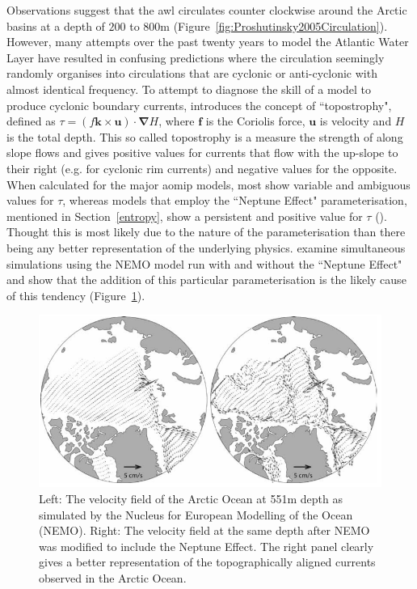 \documentclass[12pt,a4paper]{report}
\newcommand*\figref[1]{Figure~\ref{#1}}
\newcommand*\secref[1]{Section~\ref{#1}}
\begin{document}
Observations suggest that the \gls{awl} circulates counter clockwise around the
 Arctic basins at a depth of $200$ to $800\mathrm{m}$
 (\figref{fig:Proshutinsky2005Circulation}). However, many attempts over the past twenty
 years to model the Atlantic Water Layer have resulted in confusing predictions where the
 circulation seemingly randomly organises into circulations that are cyclonic or
 anti-cyclonic with almost identical frequency. To attempt to diagnose the skill of a model
 to produce cyclonic boundary currents, \cite{holloway2007water} introduces the concept of ``topostrophy",
 defined as   $\tau=(f\boldsymbol{k}\times\boldsymbol{u})\cdot\boldsymbol{\nabla}H$, where
 $\boldsymbol{f}$  is the Coriolis force,  $\boldsymbol{u}$ is velocity and  $H$ is the total depth. 
 This so called topostrophy is a measure the strength of along slope flows and gives
 positive values for currents that flow with the up-slope to their right (e.g. for cyclonic
 rim currents) and negative values for the opposite.  When calculated for the major
 \gls{aomip} models, most show variable and ambiguous values for $\tau$,  whereas models that
 employ the ``Neptune Effect" parameterisation, mentioned in \secref{entropy}, show a persistent and positive
 value for  $\tau$ (\cite{proshutinsky2011recent}). Thought this is most likely due to the
 nature of the parameterisation than there being any better representation of the 
 underlying physics. \cite{holloway2009representing} examine
 simultaneous simulations using the NEMO model run with and without the ``Neptune Effect" and
 show that the addition of this particular parameterisation is the likely cause of this
 tendency (\figref{fig:HolloWang2009}).  


\begin{figure}
	\centering
	\includegraphics[width=\linewidth]{HolloWang2009}
	\caption[\cite{holloway2009representing}]{Left: The velocity field of the Arctic Ocean at 551m depth as simulated by the Nucleus for European Modelling of the Ocean (NEMO). Right: The velocity field at the same depth after NEMO was modified to include the Neptune Effect. The right panel clearly gives a better representation of the topographically aligned currents observed in the Arctic Ocean.  \cite{holloway2009representing}}
	\label{fig:HolloWang2009}
\end{figure}
\end{document}
